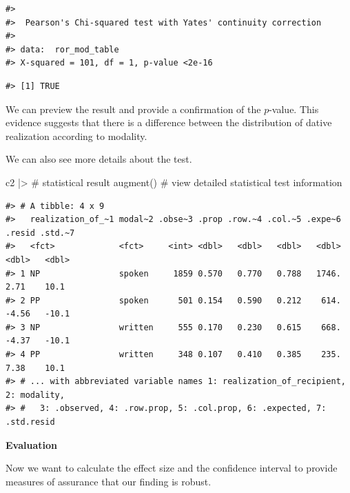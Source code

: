 \documentclass[
  letterpaper,
]{latex/krantz}
\newenvironment{Shaded}{\begin{snugshade}}{\end{snugshade}}
\newcommand{\CommentTok}[1]{\textcolor[rgb]{0.37,0.37,0.37}{#1}}
\newcommand{\DecValTok}[1]{\textcolor[rgb]{0.68,0.00,0.00}{#1}}
\newcommand{\FunctionTok}[1]{\textcolor[rgb]{0.28,0.35,0.67}{#1}}
\newcommand{\NormalTok}[1]{\textcolor[rgb]{0.00,0.23,0.31}{#1}}
\newcommand{\SpecialCharTok}[1]{\textcolor[rgb]{0.37,0.37,0.37}{#1}}
\begin{document}
\begin{verbatim}
#> 
#>  Pearson's Chi-squared test with Yates' continuity correction
#> 
#> data:  ror_mod_table
#> X-squared = 101, df = 1, p-value <2e-16
\end{verbatim}

\begin{Shaded}
\end{Shaded}

\begin{verbatim}
#> [1] TRUE
\end{verbatim}

We can preview the result and provide a confirmation of the \(p\)-value.
This evidence suggests that there is a difference between the
distribution of dative realization according to modality.

We can also see more details about the test.

\begin{Shaded}
\begin{Highlighting}[]
\NormalTok{c2 }\SpecialCharTok{|\textgreater{}} \CommentTok{\# statistical result}
  \FunctionTok{augment}\NormalTok{() }\CommentTok{\# view detailed statistical test information}
\end{Highlighting}
\end{Shaded}

\begin{verbatim}
#> # A tibble: 4 x 9
#>   realization_of_~1 modal~2 .obse~3 .prop .row.~4 .col.~5 .expe~6 .resid .std.~7
#>   <fct>             <fct>     <int> <dbl>   <dbl>   <dbl>   <dbl>  <dbl>   <dbl>
#> 1 NP                spoken     1859 0.570   0.770   0.788   1746.   2.71    10.1
#> 2 PP                spoken      501 0.154   0.590   0.212    614.  -4.56   -10.1
#> 3 NP                written     555 0.170   0.230   0.615    668.  -4.37   -10.1
#> 4 PP                written     348 0.107   0.410   0.385    235.   7.38    10.1
#> # ... with abbreviated variable names 1: realization_of_recipient, 2: modality,
#> #   3: .observed, 4: .row.prop, 5: .col.prop, 6: .expected, 7: .std.resid
\end{verbatim}

\textbf{Evaluation}

Now we want to calculate the effect size and the confidence interval to
provide measures of assurance that our finding is robust.
\end{document}
